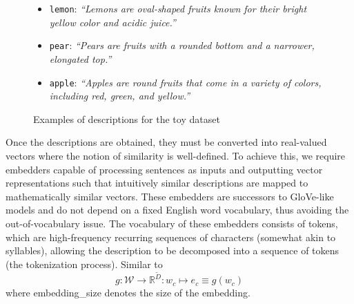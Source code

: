 \begin{figure}[htbp]
  \begin{minipage}{\textwidth}
    \begin{itemize}
      \item \texttt{lemon}: \emph{\small``Lemons are \alert{oval-shaped} fruits known for their \alert{bright yellow} color and acidic juice.''}
      \item \texttt{pear}: \emph{\small``Pears are fruits with a \alert{rounded bottom} and a narrower, \alert{elongated top}.''}
      \item \texttt{apple}: \emph{\small``Apples are \alert{round} fruits that come in a variety of colors, including \alert{red}, \alert{green}, and \alert{yellow}.''}
    \end{itemize}
    \caption{Examples of descriptions for the toy dataset}
    \label{fig:descriptions}
  \end{minipage}
\end{figure}

Once the descriptions are obtained, they must be converted into real-valued vectors where the notion of similarity is well-defined. To achieve this, we require embedders capable of processing sentences as inputs and outputting vector representations such that intuitively similar descriptions are mapped to mathematically similar vectors. These embedders are successors to GloVe-like models and do not depend on a fixed English word vocabulary, thus avoiding the out-of-vocabulary issue. The vocabulary of these embedders consists of tokens, which are high-frequency recurring sequences of characters (somewhat akin to syllables), allowing the description to be decomposed into a sequence of tokens (the tokenization process).
Similar to~
\begin{equation}
  g : \mathcal{W} \to \mathbb{R}^{\tilde{D}} :
  w_c \mapsto e_c \equiv g(w_c)
  \label{eq:desc-embedding}
\end{equation}
where \gls{embedding_size} denotes the size of the embedding.\\

